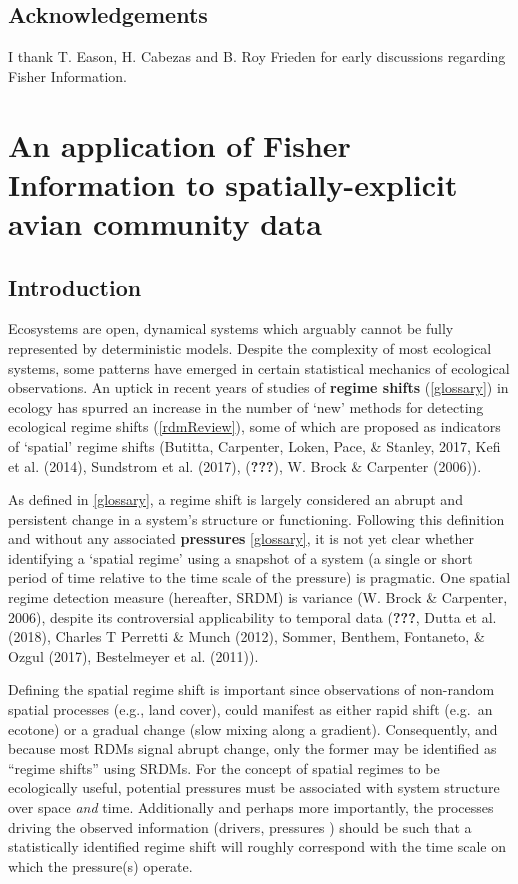 \documentclass[12pt,twoside,openany]{reedthesis}
\begin{document}
\section{Acknowledgements}\label{acknowledgements}

I thank T. Eason, H. Cabezas and B. Roy Frieden for early discussions
regarding Fisher Information.

\chapter{An application of Fisher Information to spatially-explicit
avian community data}\label{fisherSpatial}

\section{Introduction}\label{introduction-2}

Ecosystems are open, dynamical systems which arguably cannot be fully
represented by deterministic models. Despite the complexity of most
ecological systems, some patterns have emerged in certain statistical
mechanics of ecological observations. An uptick in recent years of
studies of \textbf{regime shifts} (\ref{glossary}) in ecology has
spurred an increase in the number of `new' methods for detecting
ecological regime shifts (\ref{rdmReview}), some of which are proposed
as indicators of `spatial' regime shifts (Butitta, Carpenter, Loken,
Pace, \& Stanley, 2017, Kefi et al. (2014), Sundstrom et al. (2017),
({\textbf{???}}), W. Brock \& Carpenter (2006)).

As defined in \ref{glossary}, a regime shift is largely considered an
abrupt and persistent change in a system's structure or functioning.
Following this definition and without any associated \textbf{pressures}
\ref{glossary}, it is not yet clear whether identifying a `spatial
regime' using a snapshot of a system (a single or short period of time
relative to the time scale of the pressure) is pragmatic. One spatial
regime detection measure (hereafter, SRDM) is variance (W. Brock \&
Carpenter, 2006), despite its controversial applicability to temporal
data ({\textbf{???}}, Dutta et al. (2018), Charles T Perretti \& Munch
(2012), Sommer, Benthem, Fontaneto, \& Ozgul (2017), Bestelmeyer et al.
(2011)).

Defining the spatial regime shift is important since observations of
non-random spatial processes (e.g., land cover), could manifest as
either rapid shift (e.g.~an ecotone) or a gradual change (slow mixing
along a gradient). Consequently, and because most RDMs signal abrupt
change, only the former may be identified as ``regime shifts'' using
SRDMs. For the concept of spatial regimes to be ecologically useful,
potential pressures must be associated with system structure over space
\emph{and} time. Additionally and perhaps more importantly, the
processes driving the observed information (drivers, pressures ) should
be such that a statistically identified regime shift will roughly
correspond with the time scale on which the pressure(s) operate.
\end{document}
